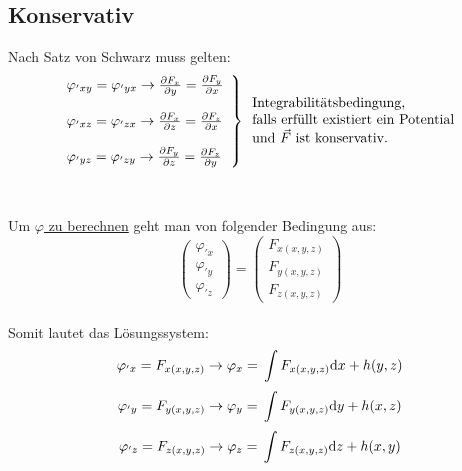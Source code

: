 \subsection{Konservativ}
Nach Satz von Schwarz muss gelten:\\
\[
\left.\begin{array}{l}
	\varphi_{'xy}=	\varphi_{'yx} \rightarrow \frac{\partial F_x}{\partial y} = \frac{\partial F_y}{\partial x} 
	\\ \\
	\varphi_{'xz}=	\varphi_{'zx} \rightarrow \frac{\partial F_x}{\partial z} = \frac{\partial F_z}{\partial x}
	\\ \\
	\varphi_{'yz}=	\varphi_{'zy} \rightarrow \frac{\partial F_y}{\partial z} = \frac{\partial F_z}{\partial y}
\end{array} \right\}
\begin{array}{l}
	\text{Integrabilitätsbedingung,}\\
	\text{falls erfüllt existiert ein Potential}\\
	\text{und $\vec{F}$ ist konservativ.}
\end{array}
\]
\\
\\
Um \underline{$\varphi$ zu berechnen} geht man von folgender Bedingung aus:
\[
	\begin{pmatrix}
	 	\varphi_{'x}\\
		\varphi_{'y}\\
		\varphi_{'z}
	\end{pmatrix} 
	=														\begin{pmatrix}
		F_{x(x,y,z)}\\										F_{y(x,y,z)}\\
		F_{z(x,y,z)}								
	\end{pmatrix} 
\]
\\
Somit lautet das Lösungssystem:
\[	
		\varphi_{'x} \\=\\ 	F_{x(x,y,z)} \\ \rightarrow \\ \varphi_{x} \\=\\ 	\int F_{x(x,y,z)}\mathrm{d} x +h(y,z)
\]
\[	
		\varphi_{'y} \\=\\  F_{y(x,y,z)} \\ \rightarrow \\
		\varphi_{y} \\=\\  \int F_{y(x,y,z)} \mathrm{d} y +h(x,z)
\]
\[
		\varphi_{'z} \\=\\  F_{z(x,y,z)} \\ \rightarrow \\
		\varphi_{z} \\=\\  \int F_{z(x,y,z)} \mathrm{d} z +h(x,y)
\]
